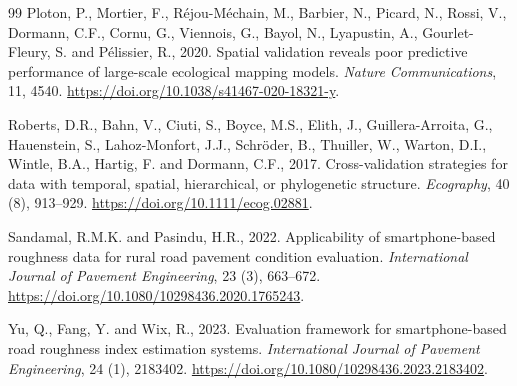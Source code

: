 \begin{thebibliography}{99}
Ploton, P., Mortier, F., R\'ejou-M\'echain, M., Barbier, N., Picard, N., Rossi, V., Dormann, C.F., Cornu, G., Viennois, G., Bayol, N., Lyapustin, A., Gourlet-Fleury, S. and P\'elissier, R., 2020. Spatial validation reveals poor predictive performance of large-scale ecological mapping models. \emph{Nature Communications}, 11, 4540. \url{https://doi.org/10.1038/s41467-020-18321-y}.

Roberts, D.R., Bahn, V., Ciuti, S., Boyce, M.S., Elith, J., Guillera-Arroita, G., Hauenstein, S., Lahoz-Monfort, J.J., Schr\"oder, B., Thuiller, W., Warton, D.I., Wintle, B.A., Hartig, F. and Dormann, C.F., 2017. Cross-validation strategies for data with temporal, spatial, hierarchical, or phylogenetic structure. \emph{Ecography}, 40 (8), 913--929. \url{https://doi.org/10.1111/ecog.02881}.

Sandamal, R.M.K. and Pasindu, H.R., 2022. Applicability of smartphone-based roughness data for rural road pavement condition evaluation. \emph{International Journal of Pavement Engineering}, 23 (3), 663--672. \url{https://doi.org/10.1080/10298436.2020.1765243}.

Yu, Q., Fang, Y. and Wix, R., 2023. Evaluation framework for smartphone-based road roughness index estimation systems. \emph{International Journal of Pavement Engineering}, 24 (1), 2183402. \url{https://doi.org/10.1080/10298436.2023.2183402}.
\end{thebibliography}
